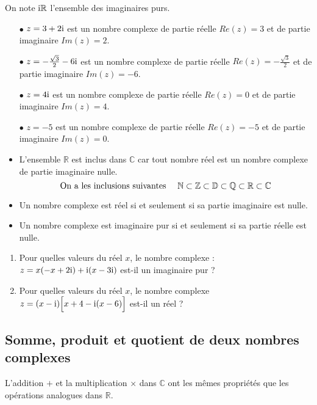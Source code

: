  On note  $ \text{i}\mathbb{R} $ l'ensemble des imaginaires purs.
\begin{example}
\begin{itemize}
\item[$  \bullet$] $ z= 3 + 2\text{i}$ est un nombre complexe de partie réelle $Re(z) = 3$ et de partie imaginaire $Im(z) = 2$.
\item[$  \bullet$]  $z= -\frac{\sqrt{3}}{2} - 6\text{i}$ est un nombre complexe de partie réelle $Re(z) = -\frac{\sqrt{3}}{2}$ et de partie imaginaire $Im(z) =-6$.
\item[$  \bullet$]  $z= 4\text{i}$ est un nombre complexe de partie réelle $Re(z) = 0$ et de partie imaginaire $Im(z) = 4$.
\item[$  \bullet$] $z = −5$ est un nombre complexe de partie réelle $Re(z) = −5$ et de partie imaginaire $Im(z) = 0$.
\end{itemize}
\end{example}
\medskip

\begin{remark}
\begin{itemize}
\item L'ensemble $ \mathbb{R} $ est inclus dans $ \mathbb{C} $ car tout nombre réel  est un nombre complexe de partie imaginaire nulle.
\[\text{On a les inclusions suivantes \quad }\mathbb{N}\subset \mathbb{Z}\subset\mathbb{D}\subset\mathbb{Q}\subset\mathbb{R}\subset\mathbb{C}\]
\item Un nombre complexe est réel si et seulement si sa partie imaginaire est nulle.
\item Un nombre complexe est imaginaire pur si et seulement si sa partie réelle est nulle.
\end{itemize}
\end{remark}
\medskip

\begin{exercice}
\begin{enumerate}
\item  Pour quelles valeurs du réel $ x $, le nombre complexe :\; $ z=x(-x+2\mathrm{i})+\mathrm{i}(x-3\text{i}) $  est-il un imaginaire pur ?
\item  Pour quelles valeurs du réel $ x $, le nombre complexe $ z=(x-\mathrm{i})\Bigl[x+4-\mathrm{i}(x-6)\Bigr] $ est-il un réel ?
\end{enumerate}
\end{exercice}
\subsection*{Somme, produit et quotient de deux nombres complexes}
L'addition $ + $ et la multiplication $ \times $ dans $ \mathbb{C} $ ont les mêmes
propriétés que les opérations analogues dans $ \mathbb{R} $.

